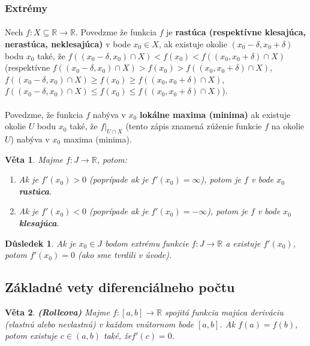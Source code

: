 \documentclass[12pt,a4paper]{article}
\newtheorem{sentence}{Věta}
\newtheorem{result}{Důsledek}
\begin{document}
\subsubsection{Extrémy}
\paragraph{}
Nech $f:X\subseteq \mathds{R}\rightarrow \mathds{R}$. Povedzme že funkcia $f$ je \textbf{rastúca (respektívne klesajúca, nerastúca, neklesajúca)} v bode $x_{0}\in X$, ak existuje okolie $(x_{0}-\delta, x_{0}+\delta)$ bodu $x_{0}$ také, že $f((x_{0}-\delta, x_{0})\cap X)<f(x_{0})<f((x_{0}, x_{0}+\delta)\cap X)$ (respektívne $f((x_{0}-\delta, x_{0})\cap X)>f(x_{0})>f((x_{0}, x_{0}+\delta)\cap X)$, $f((x_{0}-\delta, x_{0})\cap X)\geq f(x_{0})\geq f((x_{0}, x_{0}+\delta)\cap X)$, $f((x_{0}-\delta, x_{0})\cap X)\leq f(x_{0})\leq f((x_{0}, x_{0}+\delta)\cap X)$). \paragraph{}
Povedzme, že funkcia $f$ nabýva v $x_{0}$ \textbf{lokálne maxima (minima)} ak existuje okolie $U$ bodu $x_{0}$ také, že $f|_{U\cap X}$ (tento zápis znamená zúženie funkcie $f$ na okolie $U$) nabýva v $x_{0}$ maxima (minima).

\begin{sentence}
	Majme $f:J\rightarrow \mathds{R}$, potom:
	\begin{enumerate}
		\item Ak je $f'(x_{0})>0$ (poprípade ak je $f'(x_{0})=\infty$), potom je $f$ v bode $x_{0}$ \textbf{rastúca}.
		\item Ak je $f'(x_{0})<0$ (poprípade ak je $f'(x_{0})=-\infty$), potom je $f$ v bode $x_{0}$ \textbf{klesajúca}.
	\end{enumerate}
\end{sentence}

\begin{result}
	\label{dosledok1}
	Ak je $x_{0}\in J$ bodom extrému funkcie $f:J\rightarrow \mathds{R}$ a existuje $f'(x_{0})$, potom $f'(x_{0})=0$ (ako sme tvrdili v úvode).
\end{result}

\subsection{Základné vety diferenciálneho počtu}
\begin{sentence}
	\textbf{(Rolleova)} Majme $f:[a,b]\rightarrow \mathds{R}$ spojitá funkcia majúca deriváciu (vlastnú alebo nevlastnú) v každom vnútornom bode $[a,b]$. Ak $f(a)=f(b)$, potom existuje $c\in (a, b)$ také, že$f'(c)=0$.
\end{sentence}
\end{document}

